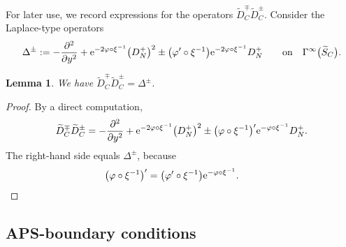 \documentclass[pdftex]{sigma}%
\numberwithin{equation}{section}
\newtheorem{Lemma}[Theorem]{Lemma}
\begin{document}
For later use, we record expressions for the operators $\widetilde{D}_C^{\mp}\widetilde{D}_C^{\pm}$.
Consider the Laplace-type operators
\begin{equation*}%
\Delta^{\pm} := -\frac{\partial^2}{\partial y^2} + {\rm e}^{-2 \varphi \circ \xi^{-1}} \big(D_N^+\big)^2 \pm \big(\varphi' \circ \xi^{-1}\big) {\rm e}^{-2 \varphi \circ \xi^{-1}} D_N^+\qquad
 \text{on}\quad \Gamma^{\infty}\big(\widetilde{S}_C\big) .
\end{equation*}

\begin{Lemma}\label{lem D02}
We have $\widetilde{D}_C^{\mp}\widetilde{D}_C^{\pm} = \Delta^{\pm}$.
\end{Lemma}
\begin{proof}
By a direct computation,
\[
\widetilde{D}_C^{\mp}\widetilde{D}_C^{\pm} =
-\frac{\partial^2}{\partial y^2} + {\rm e}^{-2\varphi \circ \xi^{-1}} \big(D_N^+\big)^2 \pm \big(\varphi \circ \xi^{-1}\big)' {\rm e}^{-\varphi\circ \xi^{-1}} D_N^+.
\]
The right-hand side equals $\Delta^{\pm}$, because
\begin{equation*}
 \big(\varphi \circ \xi^{-1}\big)' = \big(\varphi' \circ \xi^{-1}\big) {\rm e}^{-\varphi \circ \xi^{-1}}.\tag*{\qed}
\end{equation*}
\renewcommand{\qed}{}
\end{proof}

\subsection{APS-boundary conditions}
\end{document}
